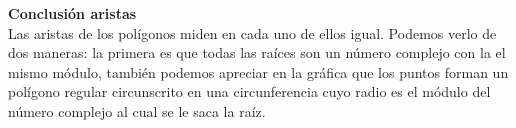 \documentclass[a4paper,12pt]{article}
\begin{document}
\begin{enumerate}
\begin{enumerate}
        \end{enumerate}
        \textbf{Conclusión aristas}
        \\Las aristas de los polígonos miden en cada uno de ellos igual. Podemos verlo de dos maneras: la primera es que todas las raíces son un número complejo con la el mismo módulo, también podemos apreciar en la gráfica que los puntos forman un polígono regular circunscrito en una circunferencia cuyo radio es el módulo del número complejo al cual se le saca la raíz.
    \end{enumerate}
\end{document}
